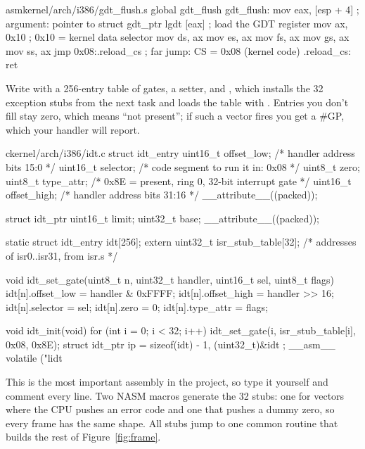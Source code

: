 \documentclass[11pt,a4paper]{article}
\begin{document}
\begin{lst}{asm}{kernel/arch/i386/gdt_flush.s}
global gdt_flush
gdt_flush:
    mov  eax, [esp + 4]     ; argument: pointer to struct gdt_ptr
    lgdt [eax]              ; load the GDT register
    mov  ax, 0x10           ; 0x10 = kernel data selector
    mov  ds, ax
    mov  es, ax
    mov  fs, ax
    mov  gs, ax
    mov  ss, ax
    jmp  0x08:.reload_cs    ; far jump: CS = 0x08 (kernel code)
.reload_cs:
    ret
\end{lst}

Write  with a 256-entry table of gates, a setter, and , which installs the
32 exception stubs from the next task and loads the table with . Entries you don't fill stay zero, which
means ``not present''; if such a vector fires you get a \#GP, which your handler will report.

\begin{lst}{c}{kernel/arch/i386/idt.c}
struct idt_entry {
    uint16_t offset_low;    /* handler address bits 15:0            */
    uint16_t selector;      /* code segment to run it in: 0x08      */
    uint8_t  zero;
    uint8_t  type_attr;     /* 0x8E = present, ring 0, 32-bit interrupt gate */
    uint16_t offset_high;   /* handler address bits 31:16           */
} __attribute__((packed));

struct idt_ptr { uint16_t limit; uint32_t base; } __attribute__((packed));

static struct idt_entry idt[256];
extern uint32_t isr_stub_table[32];     /* addresses of isr0..isr31, from isr.s */

void idt_set_gate(uint8_t n, uint32_t handler, uint16_t sel, uint8_t flags)
{
    idt[n].offset_low  = handler & 0xFFFF;
    idt[n].offset_high = handler >> 16;
    idt[n].selector    = sel;
    idt[n].zero        = 0;
    idt[n].type_attr   = flags;
}

void idt_init(void)
{
    for (int i = 0; i < 32; i++)
        idt_set_gate(i, isr_stub_table[i], 0x08, 0x8E);
    struct idt_ptr ip = { sizeof(idt) - 1, (uint32_t)&idt };
    __asm__ volatile ("lidt %
}
\end{lst}

This is the most important assembly in the project, so type it yourself and comment every line. Two NASM macros
generate the 32 stubs: one for vectors where the CPU pushes an error code and one that pushes a dummy zero, so every
frame has the same shape. All stubs jump to one common routine that builds the rest of Figure~\ref{fig:frame}.
\end{document}
